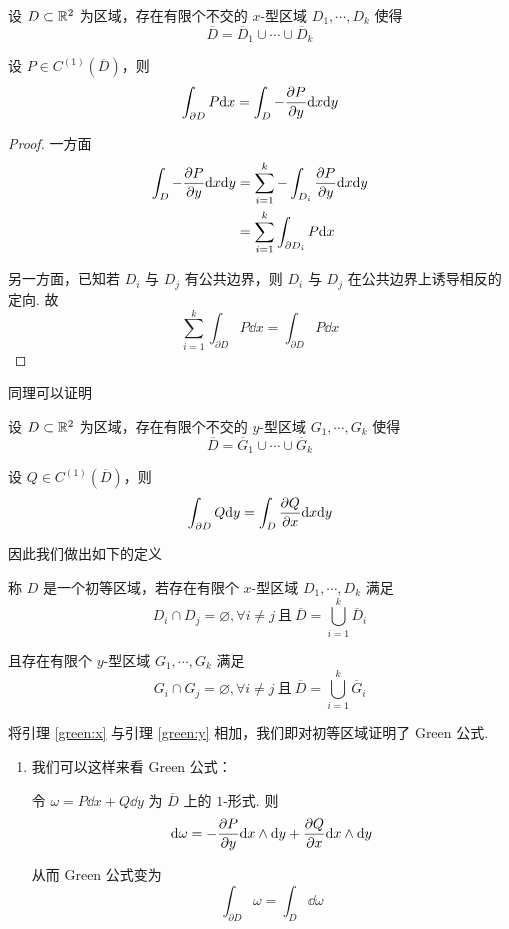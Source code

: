 \begin{lemma}\label{green:x}
    设 $D\subset\mathbb{R}^2$ 为区域，存在有限个不交的 $x$-型区域 $D_1,\cdots,D_k$ 使得 
$$
\overline{D}=\overline{D}_1\cup\cdots\cup\overline{D}_k
$$

    设 $P\in C^{(1)}(\overline{D})$，则
$$
\int_{\partial D}P\mathrm{d} x=\int_D-\frac{\partial{P}}{\partial{y}}\mathrm{d} x\mathrm{d} y
$$
\end{lemma}
\begin{proof}
    一方面
$$
\begin{aligned}
    \int_D-\frac{\partial{P}}{\partial{y}}\mathrm{d} x\mathrm{d} y&=\sum_{i=1}^k-\int_{D_i}\frac{\partial{P}}{\partial{y}}\mathrm{d} x\mathrm{d} y\\
    &=\sum_{i=1}^k\int_{\partial D_i}P\mathrm{d} x
\end{aligned}
$$

    另一方面，已知若 $D_i$ 与 $D_j$ 有公共边界，则 $D_i$ 与 $D_j$ 在公共边界上诱导相反的定向. 故
$$
\sum_{i=1}^k\int_{\partial D}P\dd x=\int_{\partial D}P\dd x
$$
\end{proof}


同理可以证明

\begin{lemma}\label{green:y}
    设 $D\subset\mathbb{R}^2$ 为区域，存在有限个不交的 $y$-型区域 $G_1,\cdots,G_k$ 使得 
$$
\overline{D}=\overline{G}_1\cup\cdots\cup\overline{G}_k
$$

    设 $Q\in C^{(1)}(\overline{D})$，则
$$
\int_{\partial D}Q\mathrm{d} y=\int_D\frac{\partial{Q}}{\partial{x}}\mathrm{d} x\mathrm{d} y
$$
\end{lemma}

因此我们做出如下的定义

\begin{definition}
    称 $D$ 是一个初等区域，若存在有限个 $x$-型区域 $D_1,\cdots,D_k$ 满足
$$
D_i\cap D_j=\varnothing,\forall i\ne j~\text{且}~\overline{D}=\bigcup_{i=1}^k\overline{D}_i
$$

    且存在有限个 $y$-型区域 $G_1,\cdots,G_k$ 满足
$$
    G_i\cap G_j=\varnothing,\forall i\ne j~\text{且}~\overline{D}=\bigcup_{i=1}^k\overline{G}_i
$$
\end{definition}


将引理 \ref{green:x} 与引理 \ref{green:y} 相加，我们即对初等区域证明了 Green 公式.

\begin{hint}
    \begin{enumerate}
        \item 我们可以这样来看 Green 公式：
        
        令 $\omega=P\dd x+Q\dd y$ 为 $\overline{D}$ 上的 $1$-形式. 则
$$
\mathrm{d}\omega=-\frac{\partial{P}}{\partial{y}}\mathrm{d} x\wedge\mathrm{d} y+\frac{\partial{Q}}{\partial{x}}\mathrm{d} x\wedge\mathrm{d} y
$$

        从而 Green 公式变为
$$
\int_{\partial D}\omega=\int_D\dd\omega
$$
    \end{enumerate}
\end{hint}